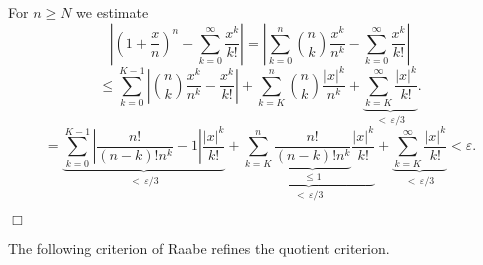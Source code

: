 For $n\geq N$ we estimate
$$
\left|\left(1+\frac{x}{n}\right)^{n}-\sum_{k=0}^{\infty}\frac{x^{k}}{k!}\right| 
= \left|\sum_{k=0}^{n}\binom{n}{k}\frac{x^{k}}{n^{k}}-\sum_{k=0}^{\infty}\frac{x^{k}}{k!} \right|
$$
$$
\leq \sum_{k=0}^{K-1}\left|\binom{n}{k}\frac{x^{k}}{n^{k}}-\frac{x^{k}}{k!}\right|+\sum_{k=K}^{n} \binom{n}{k}\frac{|x|^{k}}{n^{k}}
+\underbrace{\sum_{k=K}^{\infty}\frac{|x|^{k}}{k!}}_{<\,\varepsilon/3}. 
$$
$$
= \underbrace{\sum_{k=0}^{K-1}\left|\frac{n!}{(n-k)!n^k}-1\right|\frac{|x|^{k}}{k!}}_{<\,\varepsilon/3}
+\underbrace{\sum_{k=K}^{n} \underbrace{\frac{n!}{(n-k)!n^k}}_{\leq 1}\frac{|x|^{k}}{k!}}_{<\,\varepsilon/3}
+\underbrace{\sum_{k=K}^{\infty}\frac{|x|^{k}}{k!}}_{<\,\varepsilon/3} < \varepsilon.
$$

$\Box$

The following criterion of Raabe refines the quotient criterion.

